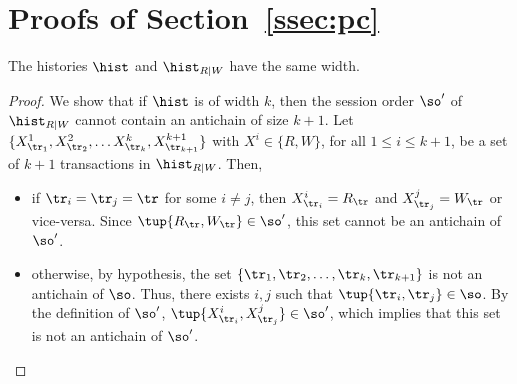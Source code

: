 
\section{Proofs of Section~\ref{ssec:pc}}\label{app:pc_red}

\begin{lemma}\label{lem:pc_width:app}
The histories $\hist$ and $\hist_{R|W}$ have the same width.
\end{lemma}
\begin{proof}
We show that if $\hist$ is of width $k$, then the session order $\so'$ of $\hist_{R|W}$ cannot contain an antichain of size $k+1$.
Let $\{X^1_{\tr_1}, X^2_{\tr_2}, \ldots X^k_{\tr_k}, X^{k+1}_{\tr_{k+1}}\}$ with $X^i\in \{R,W\}$, for all $1\leq i\leq k+1$, be a set of $k+1$ transactions in $\hist_{R|W}$. Then,
\begin{itemize}
 \item if $\tr_i = \tr_j=\tr$ for some $i \neq j$, then $X^i_{\tr_i}=R_{\tr}$ and $X^j_{\tr_j}=W_\tr$ or vice-versa. Since $\tup{R_{\tr}, W_{\tr}} \in \so'$, this set cannot be an antichain of $\so'$.
 \item otherwise, by hypothesis, the set $\{\tr_1, \tr_2, \ldots, \tr_k, \tr_{k+1}\}$ is not an antichain of $\so$. Thus, there exists $i, j$ such that $\tup{\tr_i, \tr_j} \in \so$. By the definition of $\so'$, $\tup{X^i_{\tr_i}, X^j_{\tr_j}}\in\so'$, which implies that this set is not an antichain of $\so'$.
\end{itemize}
\end{proof}

